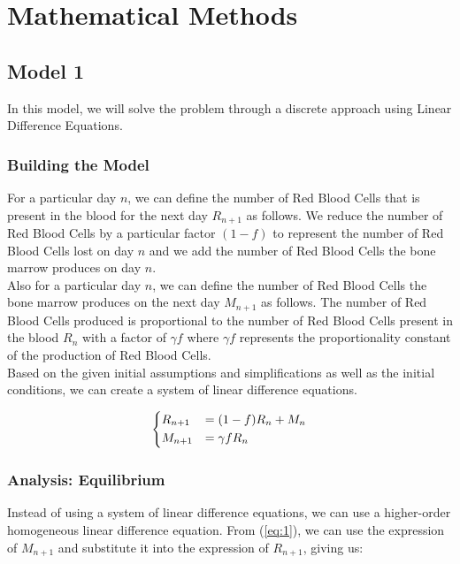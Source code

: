 \section{Mathematical Methods}

\subsection{Model 1}

In this model, we will solve the problem through a discrete approach using Linear Difference Equations.

\subsubsection{Building the Model}

For a particular day $n$, we can define the number of Red Blood Cells that is present in the blood for the next day $R_{n+1}$ as follows. We reduce the number of Red Blood Cells by a particular factor $(1-f)$ to represent the number of Red Blood Cells lost on day $n$ and we add the number of Red Blood Cells the bone marrow produces on day $n$.\\

Also for a particular day $n$, we can define the number of Red Blood Cells the bone marrow produces on the next day $M_{n+1}$ as follows. The number of Red Blood Cells produced is proportional to the number of Red Blood Cells present in the blood $R_n$ with a factor of $\gamma f$ where $\gamma f$ represents the proportionality constant of the production of Red Blood Cells.\\

Based on the given initial assumptions and simplifications as well as the initial conditions, we can create a system of linear difference equations.

\begin{equation}
    \begin{dcases}
        R_{n+1} &= (1-f)R_n + M_n\\
        M_{n+1} &= \gamma fR_n
    \end{dcases}
    \label{eq:1}
\end{equation}

\subsubsection{Analysis: Equilibrium}

Instead of using a system of linear difference equations, we can use a higher-order homogeneous linear difference equation. From (\ref{eq:1}), we can use the expression of $M_{n+1}$ and substitute it into the expression of $R_{n+1}$, giving us:

